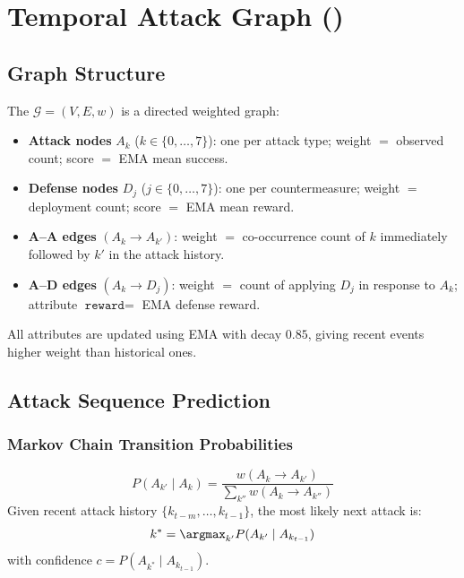 \chapter{Temporal Attack Graph (\tagraph{})}
\label{ch:tag}

\section{Graph Structure}

The \tagraph{} $\mathcal{G} = (V, E, w)$ is a directed weighted graph:
\begin{itemize}
  \item \textbf{Attack nodes} $A_k$ ($k \in \{0,\ldots,7\}$): one per
    attack type; weight $= $ observed count; score $= $ EMA mean success.
  \item \textbf{Defense nodes} $D_j$ ($j \in \{0,\ldots,7\}$): one per
    countermeasure; weight $= $ deployment count; score $= $ EMA mean reward.
  \item \textbf{A--A edges} $(A_k \to A_{k'})$: weight $= $ co-occurrence
    count of $k$ immediately followed by $k'$ in the attack history.
  \item \textbf{A--D edges} $(A_k \to D_j)$: weight $= $ count of applying
    $D_j$ in response to $A_k$; attribute $\texttt{reward} = $ EMA defense reward.
\end{itemize}

All attributes are updated using EMA with decay $0.85$, giving recent
events higher weight than historical ones.

\section{Attack Sequence Prediction}

\subsection{Markov Chain Transition Probabilities}
\begin{equation}
  P(A_{k'} \mid A_k) = \frac{w(A_k \to A_{k'})}
    {\sum_{k''} w(A_k \to A_{k''})}
\end{equation}
Given recent attack history $\{k_{t-m}, \ldots, k_{t-1}\}$, the
most likely next attack is:
\begin{equation}
  k^* = \argmax_{k'} P(A_{k'} \mid A_{k_{t-1}})
\end{equation}
with confidence $c = P(A_{k^*} \mid A_{k_{t-1}})$.

